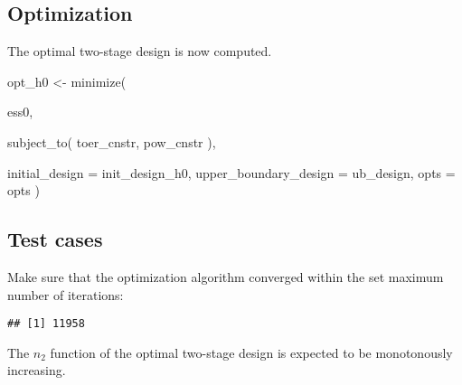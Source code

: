 \documentclass[
]{book}
\newenvironment{Shaded}{\begin{snugshade}}{\end{snugshade}}
\newcommand{\AttributeTok}[1]{\textcolor[rgb]{0.77,0.63,0.00}{#1}}
\newcommand{\DecValTok}[1]{\textcolor[rgb]{0.00,0.00,0.81}{#1}}
\newcommand{\FunctionTok}[1]{\textcolor[rgb]{0.00,0.00,0.00}{#1}}
\newcommand{\NormalTok}[1]{#1}
\newcommand{\OtherTok}[1]{\textcolor[rgb]{0.56,0.35,0.01}{#1}}
\newcommand{\SpecialCharTok}[1]{\textcolor[rgb]{0.00,0.00,0.00}{#1}}
\begin{document}
\hypertarget{optimization-14}{%
\subsection{Optimization}\label{optimization-14}}

The optimal two-stage design is now computed.

\begin{Shaded}
\begin{Highlighting}[]
\NormalTok{opt\_h0 }\OtherTok{\textless{}{-}} \FunctionTok{minimize}\NormalTok{(}
  
\NormalTok{    ess0,}
    
    \FunctionTok{subject\_to}\NormalTok{(}
\NormalTok{        toer\_cnstr,}
\NormalTok{        pow\_cnstr}
\NormalTok{    ),}
    
    \AttributeTok{initial\_design        =}\NormalTok{ init\_design\_h0,}
    \AttributeTok{upper\_boundary\_design =}\NormalTok{ ub\_design,}
    \AttributeTok{opts =}\NormalTok{ opts )}
\end{Highlighting}
\end{Shaded}

\hypertarget{test-cases-15}{%
\subsection{Test cases}\label{test-cases-15}}

Make sure that the optimization algorithm converged within the set maximum number of iterations:

\begin{Shaded}
\end{Shaded}

\begin{verbatim}
## [1] 11958
\end{verbatim}

The \(n_2\) function of the optimal two-stage design is expected to be monotonously increasing.

\begin{Shaded}
\end{Shaded}
\end{document}
